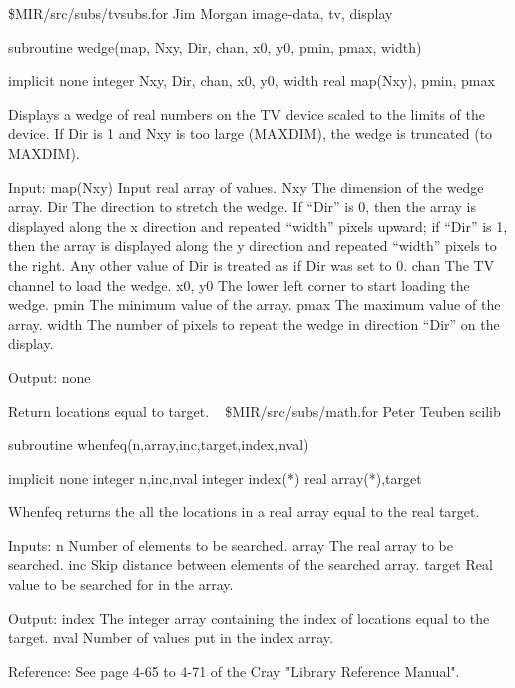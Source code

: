 \newline {} \$MIR/src/subs/tvsubs.for
\newline {} Jim Morgan
\newline {} image-data, tv, display
\par{\tenpoint
{\eightpoint\begintt
      subroutine wedge(map, Nxy, Dir, chan, x0, y0, pmin, pmax, width)

      implicit none
      integer Nxy, Dir, chan, x0, y0, width
      real map(Nxy), pmin, pmax

  Displays a wedge of real numbers on the TV device scaled to the
  limits of the device.  If Dir is 1 and Nxy is too large (MAXDIM),
  the wedge is truncated (to MAXDIM).

  Input:
    map(Nxy)     Input real array of values.
    Nxy          The dimension of the wedge array.
    Dir          The direction to stretch the wedge.  If ``Dir'' is 0,
                 then the array is displayed along the x direction
                 and repeated ``width'' pixels upward; if ``Dir'' is 1,
                 then the array is displayed along the y direction
                 and repeated ``width'' pixels to the right.  Any
                 other value of Dir is treated as if Dir was set to 0.
    chan         The TV channel to load the wedge.
    x0, y0       The lower left corner to start loading the wedge.
    pmin         The minimum value of the array.
    pmax         The maximum value of the array.
    width        The number of pixels to repeat the wedge in
                 direction ``Dir'' on the display.

  Output:
    none
\endtt}
\par}
%
\noindent Return locations equal to target.
\newline \ 
\newline {} \$MIR/src/subs/math.for
\newline {} Peter Teuben
\newline {} scilib
\par{\tenpoint
{\eightpoint\begintt
        subroutine whenfeq(n,array,inc,target,index,nval)

        implicit none
        integer n,inc,nval
        integer index(*)
        real array(*),target

  Whenfeq returns the all the locations in a real array equal to the real
  target.

  Inputs:
    n          Number of elements to be searched.
    array      The real array to be searched.
    inc        Skip distance between elements of the searched array.
    target     Real value to be searched for in the array.

  Output:
    index      The integer array containing the index of locations
               equal to the target.
    nval       Number of values put in the index array.

  Reference:
  See page 4-65 to 4-71 of the Cray "Library Reference Manual".
\endtt}
\par}
